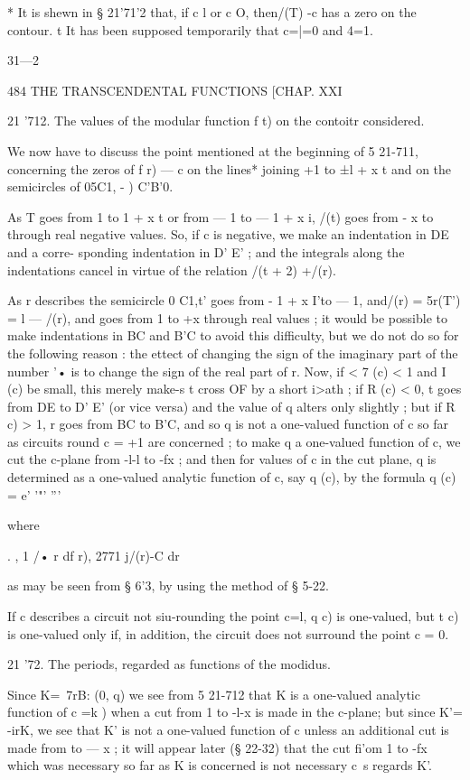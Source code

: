 * It is shewn in § 21'71'2 that, if c l or c O, then/(T) -c has a zero
on the contour. t It has been supposed temporarily that c=|=0 and 4=1.

31—2



484 THE TRANSCENDENTAL FUNCTIONS [CHAP. XXI

21 '712. The values of the modular function f t) on the contoitr
considered.

We now have to discuss the point mentioned at the beginning of 5
21-711, concerning the zeros of f r) — c on the lines* joining +1 to
±l + x t and on the semicircles of 05C1, - ) C'B'0.

As T goes from 1 to 1 + x t or from — 1 to — 1 + x i, /(t) goes from -
x to through real negative values. So, if c is negative, we make an
indentation in DE and a corre- sponding indentation in D' E' ; and the
integrals along the indentations cancel in virtue of the relation /(t
+ 2) +/(r).

As r describes the semicircle 0 C1,t' goes from - 1 + x I'to — 1,
and/(r) = 5r(T') = l — /(r), and goes from 1 to +x through real values
; it would be possible to make indentations in BC and B'C to avoid
this difficulty, but we do not do so for the following reason : the
ettect of changing the sign of the imaginary part of the number '• is
to change the sign of the real part of r. Now, if < 7 (c) < 1 and I
(c) be small, this merely make-s t cross OF by a short i>ath ; if R
(c) < 0, t goes from DE to D' E' (or vice versa) and the value of q
alters only slightly ; but if R c) > 1, r goes from BC to B'C, and so
q is not a one-valued function of c so far as circuits round c = +1
are concerned ; to make q a one-valued function of c, we cut the
c-plane from -l-l to -fx ; and then for values of c in the cut plane,
q is determined as a one-valued analytic function of c, say q (c), by
the formula q (c) = e' '"' '''

where

. , 1 /• r df r), 2771 j/(r)-C dr

as may be seen from § 6'3, by using the method of § 5-22.

If c describes a circuit not siu-rounding the point c=l, q c) is
one-valued, but t c) is one-valued only if, in addition, the circuit
does not surround the point c = 0.

21 '72. The periods, regarded as functions of the modidus.

Since K=\ 7rB: (0, q) we see from 5 21-712 that K is a one-valued
analytic function of c =k ) when a cut from 1 to -l-x is made in the
c-plane; but since K'= -irK, we see that K' is not a one-valued
function of c unless an additional cut is made from to — x ; it will
appear later (§ 22-32) that the cut fi'om 1 to -fx which was necessary
so far as K is concerned is not necessary c\ s regards K'.

